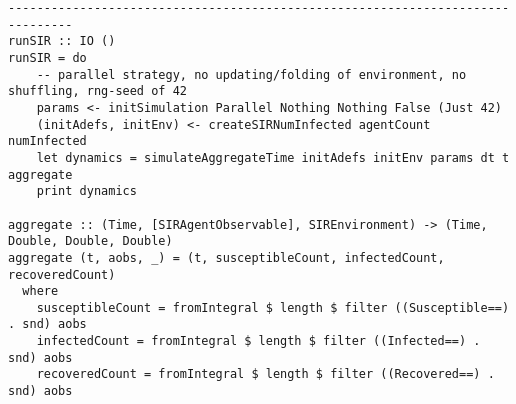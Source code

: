 \begin{verbatim}
-------------------------------------------------------------------------------
runSIR :: IO ()
runSIR = do
    -- parallel strategy, no updating/folding of environment, no shuffling, rng-seed of 42
    params <- initSimulation Parallel Nothing Nothing False (Just 42)
    (initAdefs, initEnv) <- createSIRNumInfected agentCount numInfected
    let dynamics = simulateAggregateTime initAdefs initEnv params dt t aggregate
    print dynamics
	
aggregate :: (Time, [SIRAgentObservable], SIREnvironment) -> (Time, Double, Double, Double)
aggregate (t, aobs, _) = (t, susceptibleCount, infectedCount, recoveredCount)
  where
    susceptibleCount = fromIntegral $ length $ filter ((Susceptible==) . snd) aobs
    infectedCount = fromIntegral $ length $ filter ((Infected==) . snd) aobs
    recoveredCount = fromIntegral $ length $ filter ((Recovered==) . snd) aobs
\end{verbatim}